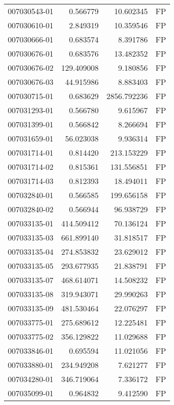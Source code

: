\begin{tabular}{lrrl}
007030543-01 &    0.566779 &      10.602345 &   FP \\
007030610-01 &    2.849319 &      10.359546 &   FP \\
007030666-01 &    0.683574 &       8.391786 &   FP \\
007030676-01 &    0.683576 &      13.482352 &   FP \\
007030676-02 &  129.409008 &       9.180856 &   FP \\
007030676-03 &   44.915986 &       8.883403 &   FP \\
007030715-01 &    0.683629 &    2856.792236 &   FP \\
007031293-01 &    0.566780 &       9.615967 &   FP \\
007031399-01 &    0.566842 &       8.266694 &   FP \\
007031659-01 &   56.023038 &       9.936314 &   FP \\
007031714-01 &    0.814420 &     213.153229 &   FP \\
007031714-02 &    0.815361 &     131.556851 &   FP \\
007031714-03 &    0.812393 &      18.494011 &   FP \\
007032840-01 &    0.566585 &     199.656158 &   FP \\
007032840-02 &    0.566944 &      96.938729 &   FP \\
007033135-01 &  414.509412 &      70.136124 &   FP \\
007033135-03 &  661.899140 &      31.818517 &   FP \\
007033135-04 &  274.853832 &      23.629012 &   FP \\
007033135-05 &  293.677935 &      21.838791 &   FP \\
007033135-07 &  468.614071 &      14.508232 &   FP \\
007033135-08 &  319.943071 &      29.990263 &   FP \\
007033135-09 &  481.530464 &      22.076297 &   FP \\
007033775-01 &  275.689612 &      12.225481 &   FP \\
007033775-02 &  356.129822 &      11.029688 &   FP \\
007033846-01 &    0.695594 &      11.021056 &   FP \\
007033880-01 &  234.949208 &       7.621277 &   FP \\
007034280-01 &  346.719064 &       7.336172 &   FP \\
007035099-01 &    0.964832 &       9.412590 &   FP \\

\end{tabular}
